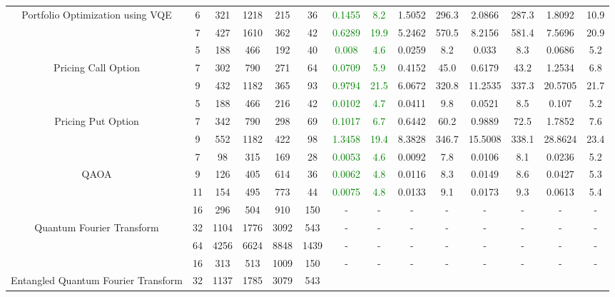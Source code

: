 \begin{table}[htb]
{\begin{tabular}{|c|c|c|c|c|c|c|c|c|c|c|c|c|c|}
Portfolio Optimization using VQE & 
6 & 321 & 1218 & 215 & 36
 & \textcolor{green}{0.1455} & \textcolor{green}{8.2}
 & 1.5052 & 296.3
 & 2.0866 & 287.3
 & 1.8092 & 10.9
 \\
 & 
7 & 427 & 1610 & 362 & 42
 & \textcolor{green}{0.6289} & \textcolor{green}{19.9}
 & 5.2462 & 570.5
 & 8.2156 & 581.4
 & 7.5696 & 20.9
 \\
\hline
 & 
5 & 188 & 466 & 192 & 40
 & \textcolor{green}{0.008} & \textcolor{green}{4.6}
 & 0.0259 & 8.2
 & 0.033 & 8.3
 & 0.0686 & 5.2
 \\
Pricing Call Option & 
7 & 302 & 790 & 271 & 64
 & \textcolor{green}{0.0709} & \textcolor{green}{5.9}
 & 0.4152 & 45.0
 & 0.6179 & 43.2
 & 1.2534 & 6.8
 \\
 & 
9 & 432 & 1182 & 365 & 93
 & \textcolor{green}{0.9794} & \textcolor{green}{21.5}
 & 6.0672 & 320.8
 & 11.2535 & 337.3
 & 20.5705 & 21.7
 \\
\hline
 & 
5 & 188 & 466 & 216 & 42
 & \textcolor{green}{0.0102} & \textcolor{green}{4.7}
 & 0.0411 & 9.8
 & 0.0521 & 8.5
 & 0.107 & 5.2
 \\
Pricing Put Option & 
7 & 342 & 790 & 298 & 69
 & \textcolor{green}{0.1017} & \textcolor{green}{6.7}
 & 0.6442 & 60.2
 & 0.9889 & 72.5
 & 1.7852 & 7.6
 \\
 & 
9 & 552 & 1182 & 422 & 98
 & \textcolor{green}{1.3458} & \textcolor{green}{19.4}
 & 8.3828 & 346.7
 & 15.5008 & 338.1
 & 28.8624 & 23.4
 \\
\hline
 & 
7 & 98 & 315 & 169 & 28
 & \textcolor{green}{0.0053} & \textcolor{green}{4.6}
 & 0.0092 & 7.8
 & 0.0106 & 8.1
 & 0.0236 & 5.2
 \\
QAOA & 
9 & 126 & 405 & 614 & 36
 & \textcolor{green}{0.0062} & \textcolor{green}{4.8}
 & 0.0116 & 8.3
 & 0.0149 & 8.6
 & 0.0427 & 5.3
 \\
 & 
11 & 154 & 495 & 773 & 44
 & \textcolor{green}{0.0075} & \textcolor{green}{4.8}
 & 0.0133 & 9.1
 & 0.0173 & 9.3
 & 0.0613 & 5.4
 \\
\hline
 & 
16 & 296 & 504 & 910 & 150
 & - & -
 & - & -
 & - & -
 & - & -
 \\
Quantum Fourier Transform & 
32 & 1104 & 1776 & 3092 & 543
 & - & -
 & - & -
 & - & -
 & - & -
 \\
 & 
64 & 4256 & 6624 & 8848 & 1439
 & - & -
 & - & -
 & - & -
 & - & -
 \\
\hline
 & 
16 & 313 & 513 & 1009 & 150
 & - & -
 & - & -
 & - & -
 & - & -
 \\
Entangled Quantum Fourier Transform & 
32 & 1137 & 1785 & 3079 & 543

\end{tabular}}
\end{table}
